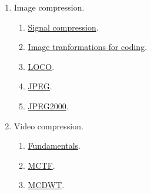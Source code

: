 \begin{enumerate}
\item Image compression.
  \begin{enumerate}
  \item \href{https://rawgit.com/vicente-gonzalez-ruiz/signal_redundancies/master/index.html}{Signal compression}.
  \item \href{https://cdn.rawgit.com/vicente-gonzalez-ruiz/transform_coding/master/index.html}{Image tranformations for coding}.
  \item \href{https://cdn.rawgit.com/vicente-gonzalez-ruiz/LOCO/master/index.html}{LOCO}.
  \item \href{https://cdn.rawgit.com/vicente-gonzalez-ruiz/JPEG/master/index.html}{JPEG}.
  \item \href{https://cdn.rawgit.com/vicente-gonzalez-ruiz/JPEG2000/master/index.html}{JPEG2000}.
  \end{enumerate}
\item Video compression.
  \begin{enumerate}
  \item \href{https://cdn.rawgit.com/vicente-gonzalez-ruiz/video_compression/master/index.html}{Fundamentals}.
  \item \href{https://github.com/vicente-gonzalez-ruiz/MCTF-video-coding}{MCTF}.
  \item \href{https://github.com/vicente-gonzalez-ruiz/MCDWT}{MCDWT}.
  \end{enumerate}
\end{enumerate}
   

